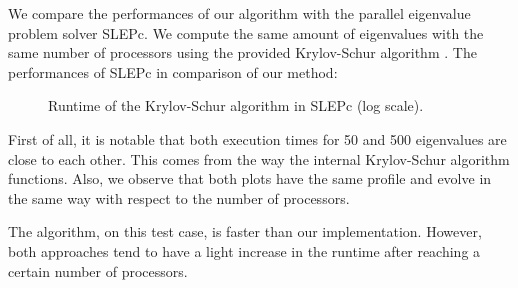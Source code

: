 We compare the performances of our algorithm with the parallel eigenvalue problem solver SLEPc.
We compute the same amount of eigenvalues with the same number of processors using the provided Krylov-Schur algorithm \cite{stewart_krylovschur_2002}.
The performances of SLEPc in comparison of our method:

\begin{figure}[H]
  \centering
  
  \caption{Runtime of the Krylov-Schur algorithm in SLEPc (log scale).}
\end{figure}

First of all, it is notable that both execution times for 50 and 500 eigenvalues are close to each other.
This comes from the way the internal Krylov-Schur algorithm functions.
Also, we observe that both plots have the same profile and evolve in the same way with respect to the number of processors.

The algorithm, on this test case, is faster than our implementation.
However, both approaches tend to have a light increase in the runtime after reaching a certain number of processors.
